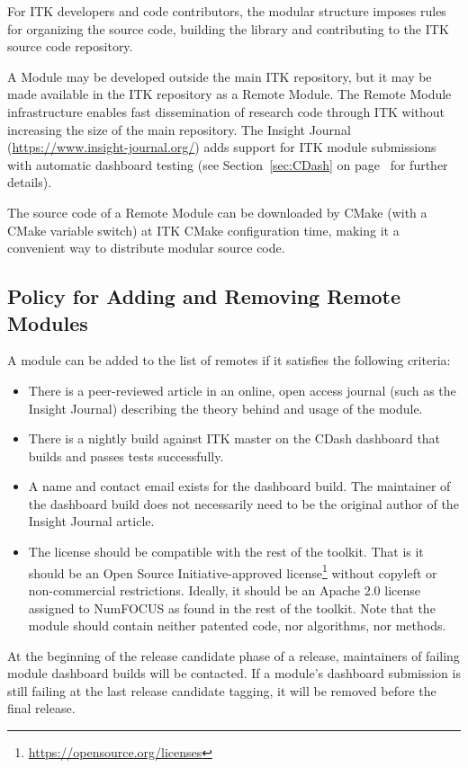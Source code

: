 For ITK developers and code contributors, the modular structure imposes rules
for organizing the source code, building the library and contributing to the
ITK source code repository.

A Module may be developed outside the main ITK repository, but it may be
made available in the ITK repository as a Remote Module. The Remote Module
infrastructure enables fast dissemination of research code through ITK without
increasing the size of the main repository. The Insight Journal
(\url{https://www.insight-journal.org/}) adds support for ITK module submissions
with automatic dashboard testing (see Section~\ref{sec:CDash} on
page~\pageref{sec:CDash} for further details).

The source code of a Remote Module can be downloaded by CMake (with a CMake
variable switch) at ITK CMake configuration time, making it a convenient way to
distribute modular source code.

\subsection{Policy for Adding and Removing Remote Modules}%
\label{subsec:RemoteModuleAddRemovePolicy}

A module can be added to the list of remotes if it satisfies the following
criteria:
\begin{itemize}
\item There is a peer-reviewed article in an online, open access journal (such
as the Insight Journal) describing the theory behind and usage of the module.
\item There is a nightly build against ITK master on the CDash dashboard that
builds and passes tests successfully.
\item A name and contact email exists for the dashboard build. The maintainer
of the dashboard build does not necessarily need to be the original author of
the Insight Journal article.
\item The license should be compatible with the rest of the toolkit. That is
it should be an Open Source Initiative-approved
license\footnote{\url{https://opensource.org/licenses}} without copyleft or
non-commercial restrictions. Ideally, it should be an Apache 2.0 license
assigned to NumFOCUS as found in the rest of the toolkit. Note that the module
should contain neither patented code, nor algorithms, nor methods.
\end{itemize}

At the beginning of the release candidate phase of a release, maintainers of
failing module dashboard builds will be contacted. If a module's dashboard
submission is still failing at the last release candidate tagging, it will be
removed before the final release.

